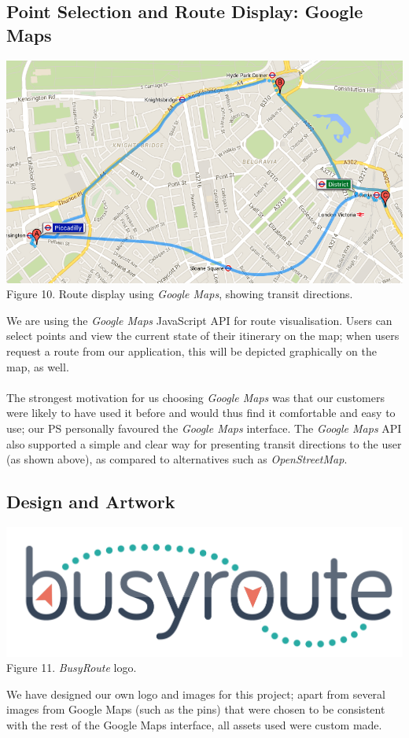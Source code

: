 \documentclass[a4paper, 10pt]{report}
\begin{document}
\subsection{Point Selection and Route Display: Google Maps}
\begin{center}
\includegraphics[scale=0.4]{gmaps_route.png} \\
Figure 10. Route display using \textit{Google Maps}, showing transit directions.
\end{center}
We are using the \textit{Google Maps} JavaScript API \cite{gmaps-js} for route visualisation. Users can select points and view the current state of their itinerary on the map; when users request a route from our application, this will be depicted graphically on the map, as well. \\\\
The strongest motivation for us choosing \textit{Google Maps} was that our customers were likely to have used it before and would thus find it comfortable and easy to use; our PS personally favoured the \textit{Google Maps} interface. The \textit{Google Maps} API also supported a simple and clear way for presenting transit directions to the user (as shown above), as compared to alternatives such as \textit{OpenStreetMap}. \cite{openstreetmap}
\subsection{Design and Artwork}
\begin{center}
\includegraphics[scale=.5]{busyroute_v7.png} \\
Figure 11. \textit{BusyRoute} logo.
\end{center}
We have designed our own logo and images for this project; apart from several images from Google Maps (such as the pins) that were chosen to be consistent with the rest of the Google Maps interface, all assets used were custom made.
\end{document}
